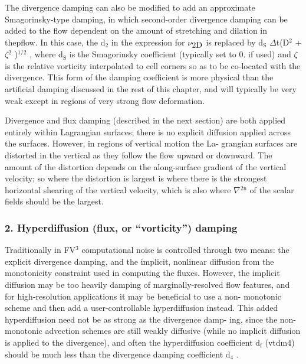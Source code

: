 The divergence damping can also be modified to add an approximate Smagorinsky-\/type damping, in which second-\/order divergence damping can be added to the flow dependent on the amount of stretching and dilation in thepflow. In this case, the d$_{\mbox{2}}$  in the expression for {$\nu$}$_{\mbox{2\-D}}$  is replaced by d$_{\mbox{S}}$ {$\Delta$}t(D$^{\mbox{2}}$  + {$\zeta$}$^{\mbox{2}}$ )$^{\mbox{1/2}}$ , where d$_{\mbox{S}}$  is the Smagorinsky coefficient (typically set to 0. if used) and {$\zeta$} is the relative vorticity interpolated to cell corners so as to be co-\/located with the divergence. This form of the damping coefficient is more physical than the artificial damping discussed in the rest of this chapter, and will typically be very weak except in regions of very strong flow deformation.

Divergence and flux damping (described in the next section) are both applied entirely within Lagrangian surfaces; there is no explicit diffusion applied across the surfaces. However, in regions of vertical motion the La-\/ grangian surfaces are distorted in the vertical as they follow the flow upward or downward. The amount of the distortion depends on the along-\/surface gradient of the vertical velocity; so where the distortion is largest is where there is the strongest horizontal shearing of the vertical velocity, which is also where {$\nabla$}$^{\mbox{2n}}$  of the scalar fields should be the largest.

\subsubsection*{2. Hyperdiffusion (flux, or “vorticity”) damping}

Traditionally in F\-V$^{\mbox{3}}$  computational noise is controlled through two means\-: the explicit divergence damping, and the implicit, nonlinear diffusion from the monotonicity constraint used in computing the fluxes. However, the implicit diffusion may be too heavily damping of marginally-\/resolved flow features, and for high-\/resolution applications it may be beneficial to use a non-\/ monotonic scheme and then add a user-\/controllable hyperdiffusion instead. This added hyperdiffusion need not be as strong as the divergence damp-\/ ing, since the non-\/monotonic advection schemes are still weakly diffusive (while no implicit diffusion is applied to the divergence), and often the hyperdiffusion coefficient d$_{\mbox{f}}$  ({\ttfamily vtdm4}) should be much less than the divergence damping coefficient d$_{\mbox{4}}$ .

